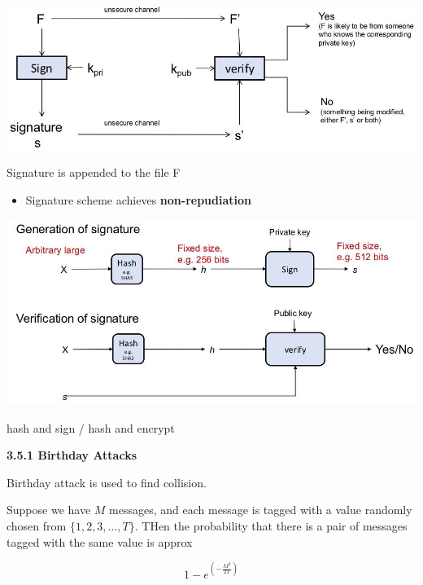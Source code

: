 \documentclass[landscape,a4paper]{extarticle}
\newenvironment{Figure}
  {\par\noindent\minipage{\linewidth}}
  {\endminipage\par\medskip}
\begin{document}
\begin{multicols*}{5}
    \begin{Figure}
        \centering
        \includegraphics[width=\linewidth]{signature.jpg}
    \end{Figure}
    Signature is appended to the file F
    \begin{itemize}
        \item Signature scheme achieves \textbf{non-repudiation}
    \end{itemize}
    \begin{Figure}
        \centering
        \includegraphics[width=\linewidth]{signature_generation_verification.jpg}
    \end{Figure}
    hash and sign / hash and encrypt

    \textbf{3.5.1 Birthday Attacks}

    Birthday attack is used to find collision. 

    Suppose we have $M$ messages, and each message is tagged with a value randomly chosen from $\{1,2,3, \ldots, T\}$.
    THen the probability that there is a pair of messages tagged with the same value is approx

    \begin{equation*}
        1-e^{\left(-\frac{M^2}{2T}\right)}
    \end{equation*}

\end{multicols*}
\end{document}
